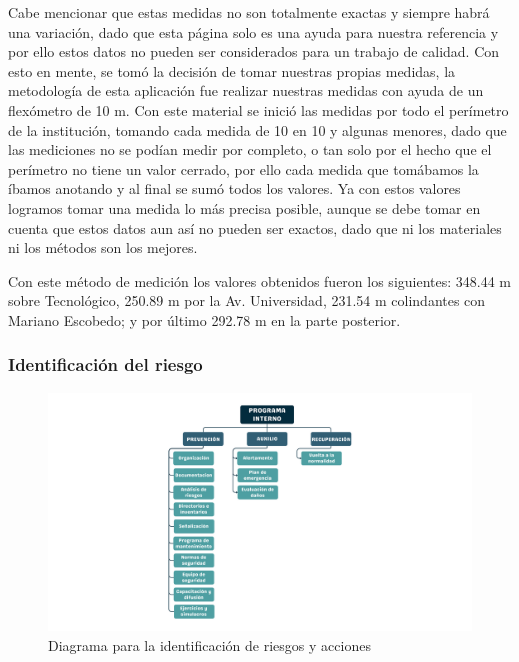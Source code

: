     Cabe mencionar que estas medidas no son totalmente exactas y siempre habrá una variación, dado que esta página solo es una ayuda para nuestra referencia y por ello estos datos no pueden ser considerados para un trabajo de calidad. Con esto en mente, se tomó la decisión de tomar nuestras propias medidas, la metodología de esta aplicación fue realizar nuestras medidas con ayuda de un flexómetro de 10 m. Con este material se inició las medidas por todo el perímetro de la institución, tomando cada medida de 10 en 10 y algunas menores, dado que las mediciones no se podían medir por completo, o tan solo por el hecho que el perímetro no tiene un valor cerrado, por ello cada medida que tomábamos la íbamos anotando y al final se sumó todos los valores. Ya con estos valores logramos tomar una medida lo más precisa posible, aunque se debe tomar en cuenta que estos datos aun así no pueden ser exactos, dado que ni los materiales ni los métodos son los mejores.
    
    Con este método de medición los valores obtenidos fueron los siguientes: 348.44 m sobre Tecnológico, 250.89 m por la Av. Universidad, 231.54 m  colindantes con Mariano Escobedo; y por último 292.78 m en la parte posterior.
    
    \subsubsection{Identificación del riesgo}
    
    \begin{figure}[H] 
        \centering
        \includegraphics[trim = {140mm 15mm 140mm 15mm},clip,scale=0.35]{22/Img/programaInterno.pdf}
        \caption{Diagrama para la identificación de riesgos y acciones}
        \label{fig:dig}
    \end{figure}
    
